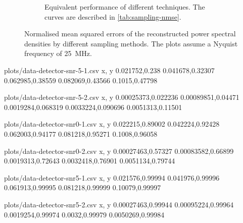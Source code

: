 \documentclass[a4paper, openany, oneside]{memoir}
\begin{document}
\begin{figure}
{\begin{subfigure}[t]{0.8\paperwidth}
		\caption{Equivalent performance of different techniques. The curves are described in \cref{tab:sampling-nmse}.}
		\label{fig:plot-nmse}
	\end{subfigure}
	}
	\caption{Normalised mean squared errors of the reconstructed power spectral densities by different sampling methods. The plots assume a Nyquist frequency of \SI{25}{MHz}.}
\end{figure}











\begin{filecontents*}{plots/data-detector-snr-5-1.csv}
x, y
0.021752,0.238
0.041678,0.32307
0.062985,0.38559
0.082069,0.43566
0.1015,0.47798
\end{filecontents*}
\begin{filecontents*}{plots/data-detector-snr-5-2.csv}
x, y
0.00025373,0.022236
0.00089851,0.04471
0.0019284,0.068319
0.0033224,0.090696
0.0051313,0.11501
\end{filecontents*}
\begin{filecontents*}{plots/data-detector-snr0-1.csv}
x, y
0.022215,0.89002
0.042224,0.92428
0.062003,0.94177
0.081218,0.95271
0.1008,0.96058
\end{filecontents*}
\begin{filecontents*}{plots/data-detector-snr0-2.csv}
x, y
0.00027463,0.57327
0.00083582,0.66899
0.0019313,0.72643
0.0032418,0.76901
0.0051134,0.79744
\end{filecontents*}
\begin{filecontents*}{plots/data-detector-snr5-1.csv}
x, y
0.021576,0.99994
0.041976,0.99996
0.061913,0.99995
0.081218,0.99999
0.10079,0.99997
\end{filecontents*}
\begin{filecontents*}{plots/data-detector-snr5-2.csv}
x, y
0.00027463,0.99944
0.00095224,0.99964
0.0019254,0.99974
0.0032,0.99979
0.0050269,0.99984
\end{filecontents*}
\end{document}
